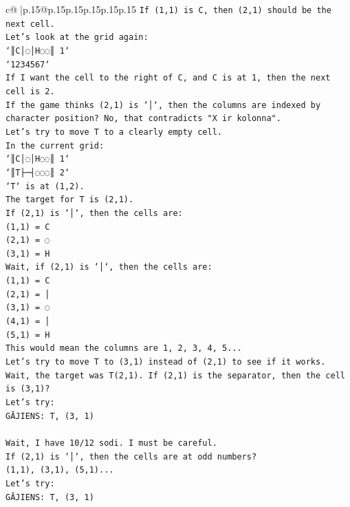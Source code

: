 \documentclass{article}
\begin{document}
{\begin{supertabular}{c@{$\;$}|p{.15\linewidth}@{}p{.15\linewidth}p{.15\linewidth}p{.15\linewidth}p{.15\linewidth}p{.15\linewidth}}
{{{\texttt{If (1,1) is C, then (2,1) should be the next cell.} \\
\texttt{Let's look at the grid again:} \\
\texttt{`║C│◌│H◌◌║ 1`} \\
\texttt{`1234567`} \\
\texttt{If I want the cell to the right of C, and C is at 1, then the next cell is 2.} \\
\texttt{If the game thinks (2,1) is `│`, then the columns are indexed by character position? No, that contradicts "X ir kolonna".} \\
\texttt{Let's try to move T to a clearly empty cell.} \\
\texttt{In the current grid:} \\
\texttt{`║C│◌│H◌◌║ 1`} \\
\texttt{`║T├─┤◌◌◌║ 2`} \\
\texttt{`T` is at (1,2).} \\
\texttt{The target for T is (2,1).} \\
\texttt{If (2,1) is `│`, then the cells are:} \\
\texttt{(1,1) = C} \\
\texttt{(2,1) = ◌} \\
\texttt{(3,1) = H} \\
\texttt{Wait, if (2,1) is `│`, then the cells are:} \\
\texttt{(1,1) = C} \\
\texttt{(2,1) = │} \\
\texttt{(3,1) = ◌} \\
\texttt{(4,1) = │} \\
\texttt{(5,1) = H} \\
\texttt{This would mean the columns are 1, 2, 3, 4, 5...} \\
\texttt{Let's try to move T to (3,1) instead of (2,1) to see if it works.} \\
\texttt{Wait, the target was T(2,1). If (2,1) is the separator, then the cell is (3,1)?} \\
\texttt{Let's try:} \\
\texttt{GĀJIENS: T, (3, 1)} \\
\\ 
\texttt{Wait, I have 10/12 sodi. I must be careful.} \\
\texttt{If (2,1) is `│`, then the cells are at odd numbers?} \\
\texttt{(1,1), (3,1), (5,1)...} \\
\texttt{Let's try:} \\
\texttt{GĀJIENS: T, (3, 1)} \\
            }
        }
    }
     \\ \\


\end{supertabular}}
\end{document}
